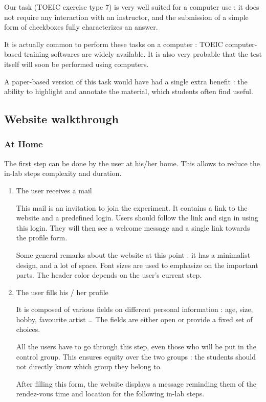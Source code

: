 \documentclass[a4paper,12pt]{article}
\begin{document}
Our task (TOEIC exercise type 7) is very well suited for a computer use : it does not require any interaction with an instructor, and the submission of a simple form of checkboxes fully characterizes an answer.

It is actually common to perform these tasks on a computer : TOEIC computer-based training softwares are widely available. It is also very probable that the test itself will soon be performed using computers.

A paper-based version of this task would have had a single extra benefit : the ability to highlight and annotate the material, which students often find useful.

\subsection{Website walkthrough}

\subsubsection{At Home}

The first step can be done by the user at his/her home. This allows to reduce the in-lab steps complexity and duration.

\begin{enumerate}

\item The user receives a mail

This mail is an invitation to join the experiment. It contains a link to the website and a predefined login. Users should follow the link and sign in using this login. They will then see a welcome message and a single link towards the profile form.

Some general remarks about the website at this point : it has a minimalist design, and a lot of space. Font sizes are used to emphasize on the important
parts. The header color depends on the user's current step.

\item The user fills his / her profile

It is composed of various fields on different personal information : age, size, hobby, favourite artist … The fields are either open or provide a fixed set of choices.

All the users have to go through this step, even those who will be put in the control group. This ensures equity over the two groups : the students should not directly know which group they belong to.

After filling this form, the website displays a message reminding them of the rendez-vous time and location for the following in-lab steps.
\end{enumerate}
\end{document}
